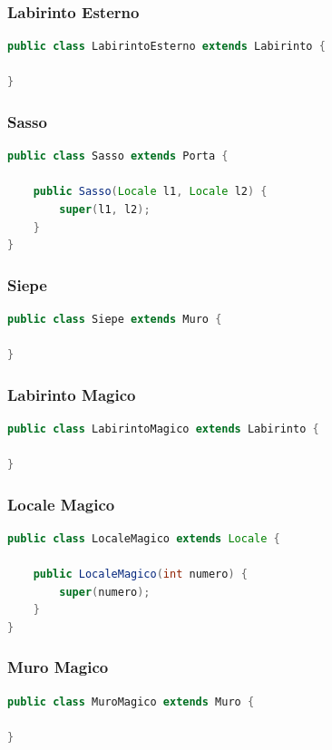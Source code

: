 \documentclass{article}
\begin{document}
\subsubsection{Labirinto Esterno}
\begin{lstlisting}[language=Java]
public class LabirintoEsterno extends Labirinto {

}
\end{lstlisting}

\subsubsection{Sasso}
\begin{lstlisting}[language=Java]
public class Sasso extends Porta {

	public Sasso(Locale l1, Locale l2) {
		super(l1, l2);
	}
}
\end{lstlisting}

\subsubsection{Siepe}
\begin{lstlisting}[language=Java]
public class Siepe extends Muro {

}
\end{lstlisting}

\subsubsection{Labirinto Magico}
\begin{lstlisting}[language=Java]
public class LabirintoMagico extends Labirinto {

}
\end{lstlisting}

\subsubsection{Locale Magico}
\begin{lstlisting}[language=Java]
public class LocaleMagico extends Locale {

	public LocaleMagico(int numero) {
		super(numero);
	}
}
\end{lstlisting}

\subsubsection{Muro Magico}
\begin{lstlisting}[language=Java]
public class MuroMagico extends Muro {

}
\end{lstlisting}
\end{document}
